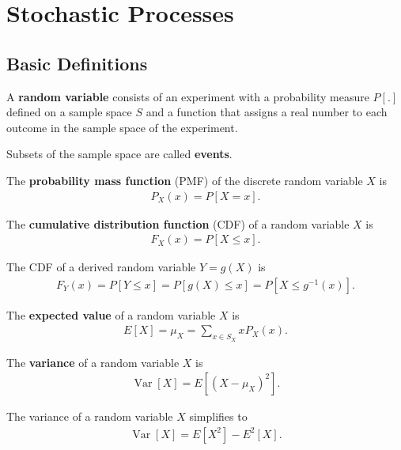 \documentclass{memoir}
\newcommand{\Var}{\operatorname{Var}}
\begin{document}
\chapter{Stochastic Processes}
\section{Basic Definitions}
\begin{definition}
    A \textbf{random variable} consists of an experiment with a probability measure $P[.]$ defined on a sample space $S$ and a function that assigns a real number to each outcome in the sample space of the experiment.
\end{definition}

\begin{definition}
    Subsets of the sample space are called \textbf{events}.
\end{definition}

\begin{definition}
    The \textbf{probability mass function} (PMF) of the discrete random variable $X$ is
    \begin{align*}
        P_X(x) = P[X=x].
    \end{align*}
\end{definition}

\begin{definition}
    The \textbf{cumulative distribution function} (CDF) of a random variable $X$ is
    \begin{align*}
        F_X(x) = P[X \le x].
    \end{align*}
\end{definition}
The CDF of a derived random variable $Y=g(X)$ is
\begin{align*}
    F_{Y}(x) = P[Y \le x] = P[g(X) \le x] = P[X \le g^{-1}(x)].
\end{align*}

\begin{definition}
    The \textbf{expected value} of a random variable $X$ is
    \begin{align*}
        E[X]=\mu_X = \sum_{x \in S_X} x P_X(x).
    \end{align*}
\end{definition}

\begin{definition}
    The \textbf{variance} of a random variable $X$ is
    \begin{align*}
        \Var[X] = E[(X-\mu_X)^2].
    \end{align*}
\end{definition}
The variance of a random variable $X$ simplifies to
\begin{align*}
    \Var[X] = E[X^2] - E^2[X].
\end{align*}
\end{document}
